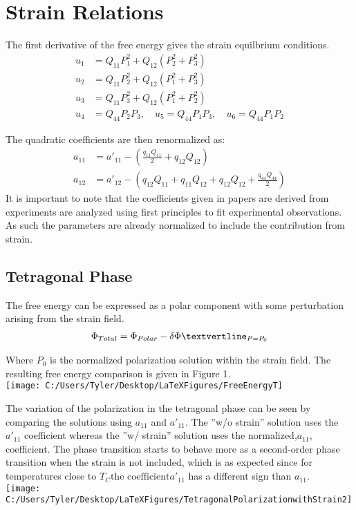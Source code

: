 \documentclass{article}
\begin{document}
\section{Strain Relations}
\label{sec:Strain}
The first derivative of the free energy gives the strain equilbrium conditions.
\begin{align}
u_1 &= Q_{11} P_1^2 + Q_{12}(P_2^2 + P_3^2) \\
u_2 &= Q_{11} P_2^2 + Q_{12}(P_1^2 + P_3^2) \\
u_3 &= Q_{11} P_3^2 + Q_{12}(P_1^2 + P_2^2) \\
u_4 &= Q_{44}P_2P_3, \quad u_5=  Q_{44}P_1P_3, \quad u_6=  Q_{44}P_1P_2
\end{align}

The quadratic coefficients are then renormalized as:
\begin{align}
a_{11} &=  a'_{11}-( \frac{q_{11} Q_{11}}{2}+q_{12}Q_{12}) \\
a_{12} &= a'_{12}-(q_{12} Q_{11}+q_{11} Q_{12}+q_{12} Q_{12}+\frac{q_{44} Q_{44}}{2})
\end{align}
It is important to note that the coefficients given in papers are derived from experiments are analyzed using first principles to fit experimental observations.  As such the parameters are already normalized to include the contribution from strain.
\newpage
\subsection{Tetragonal Phase}
The free energy can be expressed as a polar component with some perturbation arising from the strain field.
\begin{align}
\Phi_{Total}=\Phi_{Polar}-\delta\Phi \text{\textvertline}_{P=P_0}
\end{align}

Where $P_0$ is the normalized polarization solution within the strain field.
The resulting free energy comparison is given in Figure 1. \\
\vspace{12pt}
\texttt{[image: C:/Users/Tyler/Desktop/LaTeXFigures/FreeEnergyT]}

The variation of the polarization in the tetragonal phase can be seen by comparing the solutions using $a_{11}$ and $a'_{11}$.  The ''w/o strain'' solution uses the $a'_{11}$ coefficient whereas the ''w/ strain'' solution uses the normalized,$a_{11}$, coefficient.  The phase transition starts to behave more as a second-order phase transition when the strain is not included, which is as expected since for temperatures close to $T_C \text{the coefficient} a'_{11}$ has a different sign than $a_{11}$. \\

\texttt{[image: C:/Users/Tyler/Desktop/LaTeXFigures/TetragonalPolarizationwithStrain2]}
\end{document}
